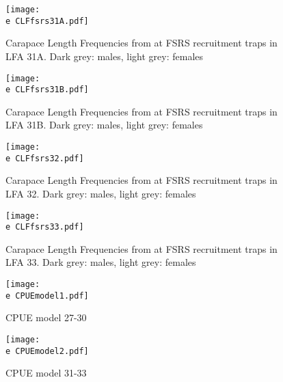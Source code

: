 \documentclass[11pt]{article}
\newcommand{\e}{\string~/bio.data/bio.lobster/figures/LFA2733Framework2018/} %
\begin{document}
    \begin{figure}
    \centering
        \texttt{[image: \\e CLFfsrs31A.pdf]}
        \caption{Carapace Length Frequencies from at FSRS recruitment traps in LFA 31A. Dark grey: males, light grey: females}

    \end{figure}


    \begin{figure}
    \centering
        \texttt{[image: \\e CLFfsrs31B.pdf]}
        \caption{Carapace Length Frequencies from at FSRS recruitment traps in LFA 31B. Dark grey: males, light grey: females}

    \end{figure}


    \begin{figure}
    \centering
        \texttt{[image: \\e CLFfsrs32.pdf]}
        \caption{Carapace Length Frequencies from at FSRS recruitment traps in LFA 32. Dark grey: males, light grey: females}

    \end{figure}


    \begin{figure}
    \centering
        \texttt{[image: \\e CLFfsrs33.pdf]}
        \caption{Carapace Length Frequencies from at FSRS recruitment traps in LFA 33. Dark grey: males, light grey: females}

    \end{figure}


    \begin{figure}
    \centering
        \texttt{[image: \\e CPUEmodel1.pdf]}
        \caption{CPUE model 27-30}

    \end{figure}


    \begin{figure}
    \centering
        \texttt{[image: \\e CPUEmodel2.pdf]}
        \caption{CPUE model 31-33}

    \end{figure}
\end{document}
